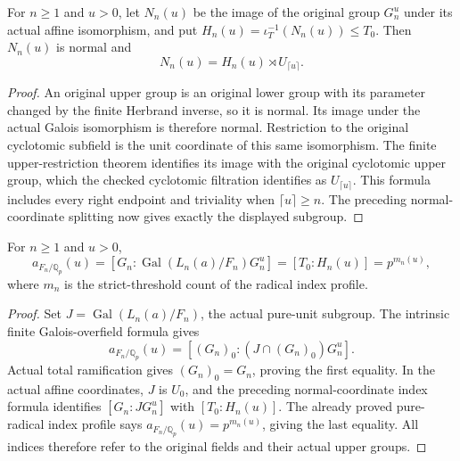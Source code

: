 \begin{lemma}
\label{ft:finite-upper-structure}
\leanok
For $n\geq1$ and $u>0$, let $N_n(u)$ be the image of the original
group $G_n^u$ under its actual affine isomorphism, and put
$H_n(u)=\iota_T^{-1}(N_n(u))\leq T_0$. Then $N_n(u)$ is normal and
\[
 N_n(u)=H_n(u)\rtimes U_{\lceil u\rceil}.
\]
\end{lemma}
\begin{proof}
An original upper group is an original lower group with its parameter
changed by the finite Herbrand inverse, so it is normal.
Its image under the actual Galois isomorphism is therefore normal.
Restriction to the original cyclotomic subfield is the unit coordinate
of this same isomorphism. The finite upper-restriction theorem identifies
its image with the original cyclotomic upper group, which the checked
cyclotomic filtration identifies as $U_{\lceil u\rceil}$.
This formula includes every right endpoint and triviality when
$\lceil u\rceil\geq n$. The preceding normal-coordinate splitting now
gives exactly the displayed subgroup.
\end{proof}

\begin{lemma}
\label{ft:finite-upper-radical-index}
\leanok
For $n\geq1$ and $u>0$,
\[
 a_{F_n/\mathbb Q_p}(u)
 =[G_n:\operatorname{Gal}(L_n(a)/F_n)G_n^u]
 =[T_0:H_n(u)]=p^{m_n(u)},
\]
where $m_n$ is the strict-threshold count of the radical index profile.
\end{lemma}
\begin{proof}
Set $J=\operatorname{Gal}(L_n(a)/F_n)$, the actual pure-unit subgroup.
The intrinsic finite Galois-overfield formula gives
\[
 a_{F_n/\mathbb Q_p}(u)
 =[(G_n)_0:(J\cap(G_n)_0)G_n^u].
\]
Actual total ramification gives $(G_n)_0=G_n$, proving the first equality.
In the actual affine coordinates, $J$ is $U_0$, and the preceding
normal-coordinate index formula identifies $[G_n:JG_n^u]$ with
$[T_0:H_n(u)]$. The already proved pure-radical index profile says
$a_{F_n/\mathbb Q_p}(u)=p^{m_n(u)}$, giving the last equality.
All indices therefore refer to the original fields and their actual
upper groups.
\end{proof}

